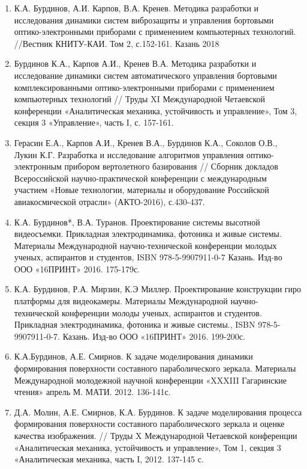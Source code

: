 \begin{enumerate}
	\item К.А. Бурдинов, А.И. Карпов, В.А. Кренев. Методика разработки и исследования динамики систем виброзащиты и управления бортовыми оптико-электронными приборами с применением компьютерных технологий. //Вестник КНИТУ-КАИ. Том 2, с.152-161. Казань 2018
  \item Бурдинов К.А., Карпов А.И., Кренев В.А.   Методика разработки и исследование динамики систем автоматического управления бортовыми комплексированными оптико-электронными приборами с применением компьютерных технологий // Труды XI Международной Четаевской конференции «Аналитическая механика, устойчивость и управление», Том 3, секция 3 «Управление», часть I, с. 157-161.
  \item Герасин Е.А., Карпов А.И., Кренев В.А., Бурдинов К.А., Соколов О.В., Лукин К.Г. Разработка и исследование алгоритмов управления оптико-электронным прибором вертолетного базирования // Сборник докладов Всероссийской научно-практической конференции с международным участием «Новые технологии, материалы и оборудование Российской авиакосмической отрасли» (АКТО-2016), с.430-437.
  \item К.А. Бурдинов*, В.А. Туранов. Проектирование системы высотной видеосъемки. Прикладная электродинамика, фотоника и живые системы. Материалы Международной научно-технической конференции молодых ученых, аспирантов и студентов, ISBN 978-5-9907911-0-7
Казань. Изд-во ООО «16ПРИНТ» 2016. 175-179с.
  \item К.А. Бурдинов, Р.А. Мирзин, К.Э Миллер. Проектирование конструкции гиро платформы для видеокамеры. Материалы Международной научно-технической конференции молоды ученых, аспирантов и студентов. Прикладная электродинамика, фотоника и живые системы., ISBN 978-5-9907911-0-7. Казань. Изд-во ООО «16ПРИНТ» 2016. 199-200с.
  \item К.А.Бурдинов, А.Е. Смирнов. К задаче моделирования динамики формирования поверхности составного параболического зеркала. Материалы Международной молодежной научной конференции «XXXIII Гагаринские чтения» апрель М. МАТИ. 2012. 136-141с.
  \item Д.А. Молин, А.Е. Смирнов, К.А. Бурдинов. К задаче моделирования процесса формирования поверхности составного параболического зеркала и оценке качества изображения. // Труды X Международной Четаевской конференции «Аналитическая механика, устойчивость и управление», Том 1, секция 3 «Аналитическая механика, часть I, 2012. 137-145 с.

\end{enumerate}

